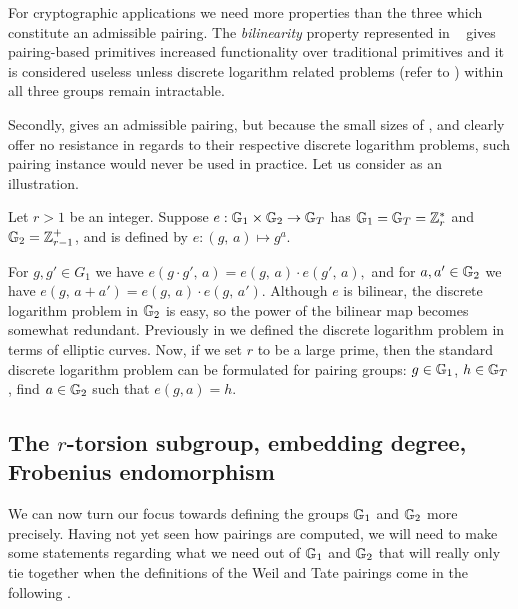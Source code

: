 For cryptographic applications we need more properties than the three which constitute
an admissible pairing. The \textit{bilinearity} property represented in ~ gives
pairing-based primitives increased functionality over traditional primitives and it is considered useless unless discrete logarithm related problems (refer to ) within all three groups remain
intractable. 

Secondly,  gives an admissible pairing, but because the small sizes of  ,  and  clearly offer no resistance in regards to their respective discrete logarithm problems, such pairing instance would never be used in practice. Let us consider  as an illustration.

\begin{example}
	Let $r > 1$ be an integer. Suppose $e : \mathbb{G}_1 \times \mathbb{G}_2 \to \mathbb{G}_T$ has
	$\mathbb{G}_1 = \mathbb{G}_T = \mathbb{Z}_r^{*}$ and $\mathbb{G}_2 = \mathbb{Z}_{r-1}^{+}$, and is defined by $e : (g,\, a) \mapsto g^a$. 
	
	For $g, g' \in G_1$ we have $e(g \cdot g',\, a) = e(g,\, a) \cdot e(g',\, a),$
	and for $a, a' \in \mathbb{G}_2$ we have  $e(g,\, a + a') = e(g,\, a) \cdot e(g,\, a')$. Although $e$ is bilinear, the discrete logarithm problem in $\mathbb{G}_2$
	is easy, so the power of the bilinear map becomes somewhat redundant. Previously in   we defined the discrete logarithm problem in terms of elliptic curves.  Now, if we set $r$ to be a large prime, then the standard discrete logarithm problem can be formulated for pairing groups: $g \in \mathbb{G}_1$, $h \in \mathbb{G}_T$, find $a \in \mathbb{G}_2$ such that $e(g, a) = h$.
	\label{example:smappgroupnodlogresistance}
\end{example}


\subsection{The $r$-torsion subgroup, embedding degree, Frobenius endomorphism}
\label{ssec:ch1.ellipticcurvesaspairinggroups.rtorsion}

We can now turn our focus towards defining the groups $\mathbb{G}_1$ and $\mathbb{G}_2$ more precisely.
Having not yet seen how pairings are computed, we will need to make some
statements regarding what we need out of $\mathbb{G}_1$ and $\mathbb{G}_2$ that will really only
tie together when the definitions of the Weil and Tate pairings come in the
following  . 

